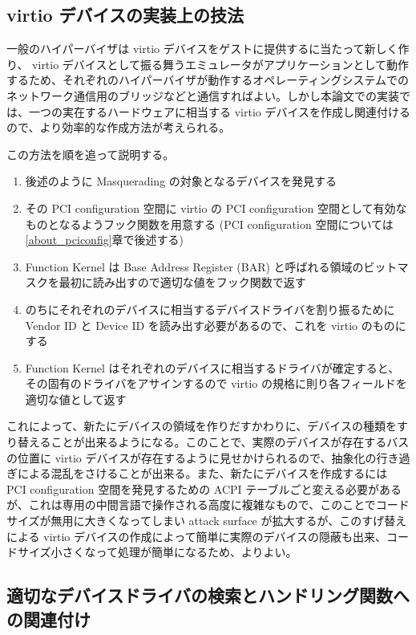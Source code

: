 \documentclass[a4paper,11pt,report]{ltjsbook}
\begin{document}
\subsection{virtio デバイスの実装上の技法}
\label{overview_vio}
一般のハイパーバイザは virtio デバイスをゲストに提供するに当たって新しく作り、 virtio デバイスとして振る舞うエミュレータがアプリケーションとして動作するため、それぞれのハイパーバイザが動作するオペレーティングシステムでのネットワーク通信用のブリッジなどと通信すればよい。しかし本論文での実装では、一つの実在するハードウェアに相当する virtio デバイスを作成し関連付けるので、より効率的な作成方法が考えられる。

この方法を順を追って説明する。

\begin{enumerate}
\item 後述のように Masquerading の対象となるデバイスを発見する
\item その PCI configuration 空間に virtio の PCI configuration 空間として有効なものとなるようフック関数を用意する (PCI configuration 空間については\ref{about_pciconfig}章で後述する)
\item Function Kernel は Base Address Register (BAR) と呼ばれる領域のビットマスクを最初に読み出すので適切な値をフック関数で返す
\item のちにそれぞれのデバイスに相当するデバイスドライバを割り振るために Vendor ID と Device ID を読み出す必要があるので、これを virtio のものにする
\item Function Kernel はそれぞれのデバイスに相当するドライバが確定すると、その固有のドライバをアサインするので virtio の規格に則り各フィールドを適切な値として返す
\end{enumerate}

これによって、新たにデバイスの領域を作りだすかわりに、デバイスの種類をすり替えることが出来るようになる。このことで、実際のデバイスが存在するバスの位置に virtio デバイスが存在するように見せかけられるので、抽象化の行き過ぎによる混乱をさけることが出来る。また、新たにデバイスを作成するには PCI configuration 空間を発見するための ACPI テーブルごと変える必要があるが、これは専用の中間言語で操作される高度に複雑なもので、このことでコードサイズが無用に大きくなってしまい attack surface が拡大するが、このすげ替えによる virtio デバイスの作成によって簡単に実際のデバイスの隠蔽も出来、コードサイズ小さくなって処理が簡単になるため、よりよい。

\subsection{適切なデバイスドライバの検索とハンドリング関数への関連付け}
\end{document}
